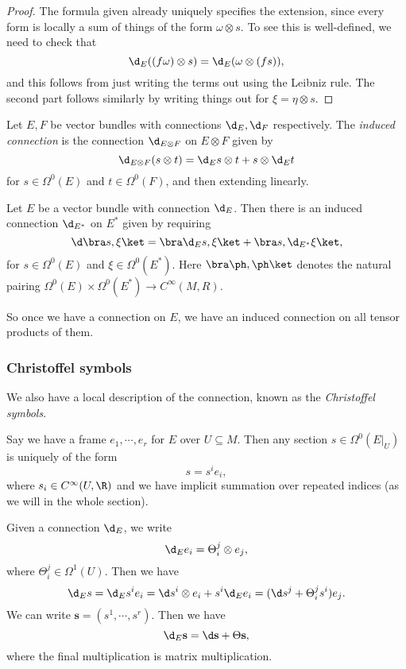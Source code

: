 \documentclass[a4paper]{article}
\begin{document}
\begin{proof}
  The formula given already uniquely specifies the extension, since every form is locally a sum of things of the form $\omega \otimes s$. To see this is well-defined, we need to check that
  \[
    \d_E ((f \omega) \otimes s) = \d_E (\omega \otimes (fs)),
  \]
  and this follows from just writing the terms out using the Leibniz rule. The second part follows similarly by writing things out for $\xi = \eta \otimes s$.
\end{proof}
\begin{defi}
  Let $E, F$ be vector bundles with connections $\d_E, \d_F$ respectively. The \emph{induced connection} is the connection $\d_{E \otimes F}$ on $E \otimes F$ given by
  \[
    \d_{E \otimes F}(s \otimes t) = \d_E s \otimes t + s \otimes \d_E t
  \]
  for $s \in \Omega^0(E)$ and $t \in \Omega^0(F)$, and then extending linearly.
\end{defi}

\begin{defi}
  Let $E$ be a vector bundle with connection $\d_E$. Then there is an induced connection $\d_{E^*}$ on $E^*$ given by requiring
  \[
    \d\bra s, \xi\ket = \bra \d_E s, \xi\ket + \bra s, \d_{E^*} \xi\ket,
  \]
  for $s \in \Omega^0(E)$ and $\xi \in \Omega^0(E^*)$. Here $\bra \ph, \ph\ket$ denotes the natural pairing $\Omega^0(E) \times \Omega^0(E^*) \to C^\infty(M, R)$.
\end{defi}
So once we have a connection on $E$, we have an induced connection on all tensor products of them.


\subsubsection*{Christoffel symbols}
We also have a local description of the connection, known as the \emph{Christoffel symbols}.

Say we have a frame $e_1, \cdots, e_r$ for $E$ over $U \subseteq M$. Then any section $s \in \Omega^0(E|_U)$ is uniquely of the form
\[
  s = s^i e_i,
\]
where $s_i \in C^\infty(U, \R)$ and we have implicit summation over repeated indices (as we will in the whole section).

Given a connection $\d_E$, we write
\[
  \d_E e_i = \Theta_i^j \otimes e_j,
\]
where $\Theta_i^j \in \Omega^1(U)$. Then we have
\[
  \d_E s = \d_E s^i e_i = \d s^i \otimes e_i + s^i \d_E e_i = (\d s^j + \Theta_i^j s^i) e_j.
\]
We can write $\mathbf{s} = (s^1, \cdots, s^r)$. Then we have
\[
  \d_E \mathbf{s} = \d \mathbf{s} + \Theta \mathbf{s},
\]
where the final multiplication is matrix multiplication.
\end{document}
